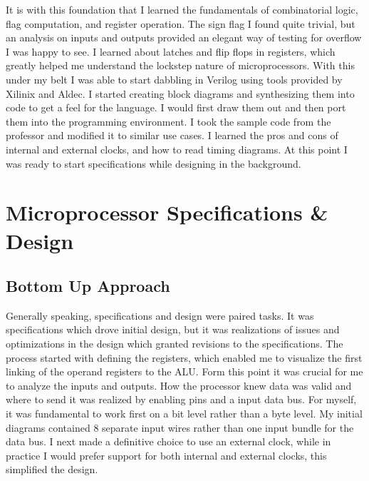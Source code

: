 \documentclass{article}
\begin{document}
It is with this foundation that I learned the fundamentals of combinatorial logic, flag computation, and register operation.
The sign flag I found quite trivial, but an analysis on inputs and outputs provided an elegant way of testing for overflow I was happy to see.
I learned about latches and flip flops in registers, which greatly helped me understand the lockstep nature of microprocessors.
With this under my belt I was able to start dabbling in Verilog using tools provided by Xilinix and Aldec.
I started creating block diagrams and synthesizing them into code to get a feel for the language.
I would first draw them out and then port them into the programming environment.
I took the sample code from the professor and modified it to similar use cases.
I learned the pros and cons of internal and external clocks, and how to read timing diagrams.
At this point I was ready to start specifications while designing in the background.

\section{Microprocessor Specifications \& Design}
\subsection{Bottom Up Approach}
Generally speaking, specifications and design were paired tasks.
It was specifications which drove initial design, but it was realizations of issues and optimizations in the design which granted revisions to the specifications.
The process started with defining the registers, which enabled me to visualize the first linking of the operand registers to the ALU.
Form this point it was crucial for me to analyze the inputs and outputs.
How the processor knew data was valid and where to send it was realized by enabling pins and a input data bus.
For myself, it was fundamental to work first on a bit level rather than a byte level.
My initial diagrams contained 8 separate input wires rather than one input bundle for the data bus.
I next made a definitive choice to use an external clock, while in practice I would prefer support for both internal and external clocks, this simplified the design.
\end{document}

